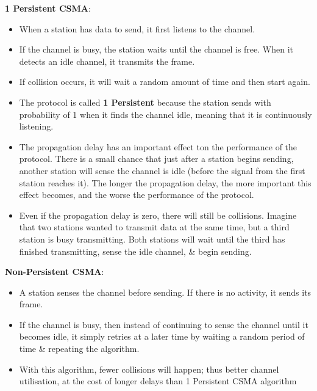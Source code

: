 \documentclass[11pt]{article}
\begin{document}
\textbf{1 Persistent CSMA}:
\begin{itemize}
    \item   When a station has data to send, it first listens to the channel. 
    \item   If the channel is busy, the station waits until the channel is free. 
            When it detects an idle channel, it transmits the frame. 
    \item   If collision occurs, it will wait a random amount of time and then start again. 
    \item   The protocol is called \textbf{1 Persistent} because the station sends with probability 
            of 1 when it finds the channel idle, meaning that it is continuously listening. 
    \item   The propagation delay has an important effect ton the performance of the protocol. 
            There is a small chance that just after a station begins sending, another station will 
            sense the channel is idle (before the signal from the first station reaches it). 
            The longer the propagation delay, the more important this effect becomes, and the worse 
            the performance of the protocol.
    \item   Even if the propagation delay is zero, there will still be collisions. 
            Imagine that two stations wanted to transmit data at the same time, but a third 
            station is busy transmitting.
            Both stations will wait until the third has finished transmitting, sense the idle channel, 
            \& begin sending.
\end{itemize} 

\textbf{Non-Persistent CSMA}:
\begin{itemize}
    \item   A station senses the channel before sending. 
            If there is no activity, it sends its frame. 
    \item   If the channel is busy, then instead of continuing to sense the channel until it becomes 
            idle, it simply retries at a later time by waiting a random period of time \& repeating the algorithm.
    \item   With this algorithm, fewer collisions will happen; thus better channel utilisation, at 
            the cost of longer delays than 1 Persistent CSMA algorithm
\end{itemize}
\end{document}
